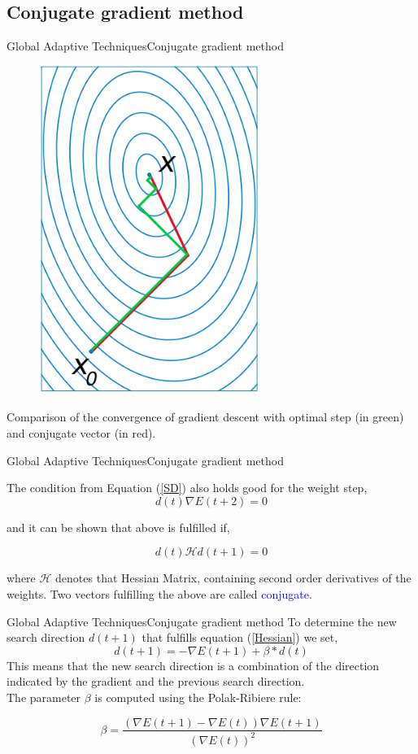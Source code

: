 \documentclass{beamer}
\begin{document}
\subsection{Conjugate gradient method}
\begin{frame}{Global Adaptive Techniques}{Conjugate gradient method}
\begin{figure}
\centering
\includegraphics[width=0.25\linewidth]{conjugategrad}
\end{figure}
Comparison of the convergence of gradient descent with optimal step (in green) and conjugate vector (in red). 

\end{frame}
	

\begin{frame}{Global Adaptive Techniques}{Conjugate gradient method}

The condition from Equation (\ref{SD}) also holds good for the weight step, 
\begin{equation*}
d(t) \nabla E(t+2) = 0
\end{equation*}

and it can be shown that above is fulfilled if, 

\begin{equation}
\label{Hessian}
d(t) \mathscr{H} d(t+1) = 0 
\end{equation}

where $ \mathscr{H} $ denotes that Hessian Matrix, containing second order derivatives of the weights. 
\vspace{3mm}
Two vectors fulfilling the above are called \textcolor{blue}{conjugate}. 


\end{frame}

\begin{frame}{Global Adaptive Techniques}{Conjugate gradient method}
To determine the new search direction $ d(t+1) $ that fulfills equation (\ref{Hessian}) we set,
\begin{equation*}
d(t+1) = - \nabla E(t+1) + \beta * d(t)
\end{equation*}
\pause
This means that the new search direction is a combination of the direction indicated by the gradient and the previous search direction. \\

\vspace{5mm}
The parameter $ \beta $ is computed using the Polak-Ribiere rule:

\begin{equation*}
\beta = \frac{(\nabla E(t+1)  - \nabla E(t)) \nabla E(t+1)}{(\nabla E(t))^2}	
\end{equation*}
	
\end{frame}	
	
\end{document}
